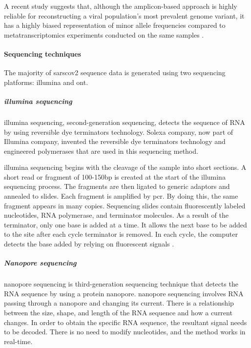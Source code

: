         A recent study suggests that, although the amplicon-based approach is highly reliable for reconstructing a viral population's most prevalent genome variant, it has a highly biased representation of minor allele frequencies compared to metatranscriptomics experiments conducted on the same samples \cite{xia2020}.
        
        \paragraph{Sequencing techniques}
        
        The majority of \acrshort{sarscov2} sequence data is generated using two sequencing platforms: \acrfull{illumina} and \acrfull{ont}. 
        
        \subparagraph{\acrshort{illumina} sequencing}
        
        \acrshort{illumina} sequencing, second-generation sequencing, detects the sequence of RNA by using reversible dye terminators technology. Solexa company, now part of Illumina company, invented the reversible dye terminators technology and engineered polymerases that are used in this sequencing method.
        
        \acrshort{illumina} sequencing begins with the cleavage of the sample into short sections.  A short read or fragment of 100-150bp is created at the start of the \acrshort{illumina} sequencing process. The fragments are then ligated to generic adaptors and annealed to slides. Each fragment is amplified by \acrfull{pcr}. By doing this, the same fragment appears in many copies. Sequencing slides contain fluorescently labeled nucleotides, RNA polymerase, and terminator molecules. As a result of the terminator, only one base is added at a time. It allows the next base to be added to the site after each cycle terminator is removed. In each cycle, the computer detects the base added by relying on fluorescent signals \cite{difference2021}. 
        
        \subparagraph{Nanopore sequencing}
        
        \acrshort{nanopore} sequencing is third-generation sequencing technique that detects the RNA sequence by using a protein nanopore. \acrshort{nanopore} sequencing involves RNA passing through a nanopore and changing its current. There is a relationship between the size, shape, and length of the RNA sequence and how a current changes. In order to obtain the specific RNA sequence, the resultant signal needs to be decoded. There is no need to modify nucleotides, and the method works in real-time.
        
